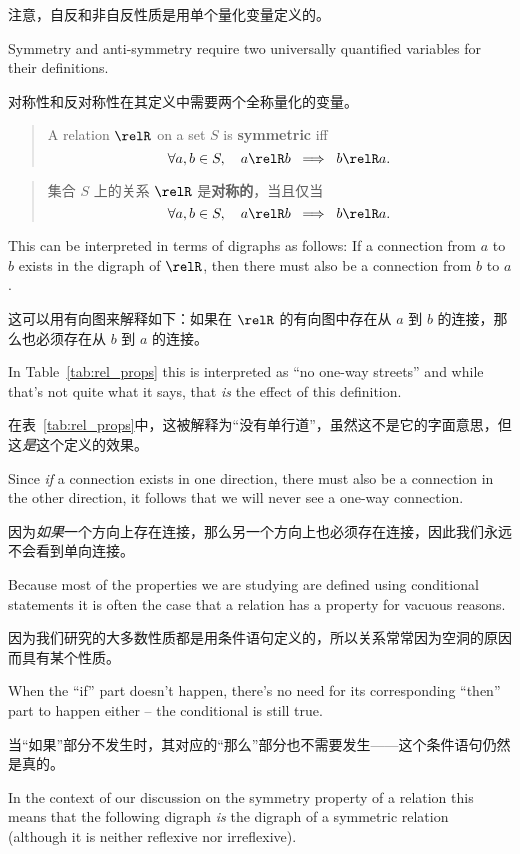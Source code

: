 注意，自反和非自反性质是用单个量化变量定义的。

Symmetry and anti-symmetry require two universally quantified variables for
their definitions.

对称性和反对称性在其定义中需要两个全称量化的变量。

\begin{quote}
A relation $\relR$ on a set $S$ is {\bf symmetric} iff
\[ \forall a,b \in S, \quad a \relR b \;
\implies \; b \relR a. \] 
\end{quote}

\begin{quote}
集合 $S$ 上的关系 $\relR$ 是{\bf 对称的}，当且仅当
\[ \forall a,b \in S, \quad a \relR b \;
\implies \; b \relR a. \] 
\end{quote}

\noindent This can be interpreted in terms of digraphs as follows:  If a connection
from $a$ to $b$ exists in the digraph of $\relR$, then there must also be a connection
from $b$ to $a$.

\noindent 这可以用有向图来解释如下：如果在 $\relR$ 的有向图中存在从 $a$ 到 $b$ 的连接，那么也必须存在从 $b$ 到 $a$ 的连接。

In Table~\ref{tab:rel_props} this is interpreted as ``no one-way streets''
and while that's not quite what it says, that \emph{is} the effect of this definition.

在表~\ref{tab:rel_props}中，这被解释为“没有单行道”，虽然这不是它的字面意思，但这\emph{是}这个定义的效果。

Since \emph{if} a connection exists in one direction, there must also be a connection 
in the other direction, it follows that we will never see a one-way connection.

因为\emph{如果}一个方向上存在连接，那么另一个方向上也必须存在连接，因此我们永远不会看到单向连接。

Because most of the properties we are studying are defined using conditional statements
it is often the case that a relation has a property for vacuous reasons.

因为我们研究的大多数性质都是用条件语句定义的，所以关系常常因为空洞的原因而具有某个性质。

When the ``if'' part
doesn't happen, there's no need for its corresponding ``then'' part to happen either -- the 
conditional is still true.

当“如果”部分不发生时，其对应的“那么”部分也不需要发生——这个条件语句仍然是真的。

In the context of our discussion on the symmetry property of
a relation this means that the following digraph \emph{is} the digraph of a symmetric
relation (although it is neither reflexive nor irreflexive).

